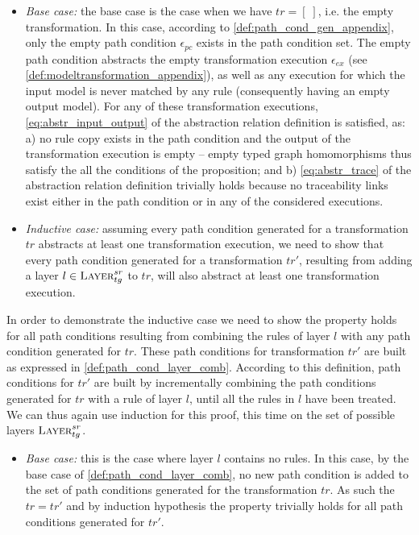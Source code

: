 \begin{ps}
\begin{itemize}
   \item \emph{Base case:} the base case is the case when we have $tr=[\;]$, i.e. the empty transformation. In this case, according to \cref{def:path_cond_gen_appendix}, only the empty path condition $\epsilon_{pc}$ exists in the path condition set. The empty path condition abstracts the empty transformation execution $\epsilon_{ex}$ (see \cref{def:modeltransformation_appendix}), as well as any execution for which the input model is never matched by any rule (consequently having an empty output model). For any of these transformation executions, \cref{eq:abstr_input_output} of the abstraction relation definition is satisfied, as: a) no rule copy exists in the path condition and the output of the transformation execution is empty -- empty typed graph homomorphisms thus satisfy the all the conditions of the proposition; and b) \cref{eq:abstr_trace} of the abstraction relation definition trivially holds because no traceability links exist either in the path condition or in any of the considered executions.
   
\item \emph{Inductive case:} assuming every path condition generated for a transformation $tr$ abstracts at least one transformation execution, we need to show that every path condition generated for a transformation $tr'$, resulting from adding a layer $l\in \textsc{Layer}^{sr}_{tg}$ to $tr$, will also abstract at least one transformation execution. 
\end{itemize}

In order to demonstrate the inductive case we need to show the property holds for all path conditions resulting from combining the rules of layer $l$ with any path condition generated for $tr$. These path conditions for transformation $tr'$ are built as expressed in \cref{def:path_cond_layer_comb}. According to this definition, path conditions for $tr'$ are built by incrementally combining the path conditions generated for $tr$ with a rule of layer $l$, until all the rules in $l$ have been treated. We can thus again use induction for this proof, this time on the set of possible layers $\textsc{Layer}^{sr}_{tg}$. 

\begin{itemize}
  \item \emph{Base case:} this is the case where layer $l$ contains no rules. In this case, by the base case of \cref{def:path_cond_layer_comb}, no new path condition is added to the set of path conditions generated for the transformation $tr$. As such the $tr=tr'$ and by induction hypothesis the property trivially holds for all path conditions generated for $tr'$.
  

\end{itemize}
\end{ps}
